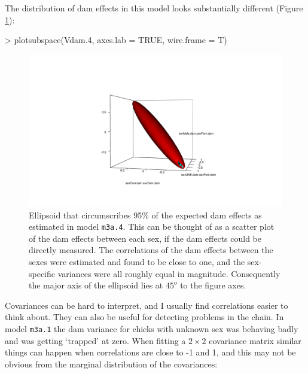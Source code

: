 \documentclass{article}
\begin{document}
The distribution of dam effects in this model looks substantially different (Figure \ref{rgl2-fig}):

\begin{Schunk}
\begin{Sinput}
> plotsubspace(Vdam.4, axes.lab = TRUE, wire.frame = T)
\end{Sinput}
\end{Schunk}

\begin{figure}[!h]
\begin{center}
\includegraphics{rgl2.pdf}
\end{center}
\caption{Ellipsoid that circumscribes 95\% of the expected dam effects as estimated in model \texttt{m3a.4}. This can be thought of as a scatter plot of the dam effects between each sex, if the dam effects could be directly measured.  The correlations of the dam effects between the sexes were estimated and found to be close to one, and the sex-specific variances were all roughly equal in magnitude.  Consequently the major axis of the ellipsoid lies at $45^{o}$ to the figure axes.}
\label{rgl2-fig}
\end{figure}


Covariances can be hard to interpret, and I usually find correlations easier to think about. They can also be useful for detecting problems in the chain. In model \texttt{m3a.1} the dam variance for chicks with unknown sex was behaving badly and was getting `trapped' at zero. When fitting a $2\times2$ covariance matrix similar things can happen when correlations are close to -1 and 1, and this may not be obvious from the marginal distribution of the covariances:

\begin{Schunk}
\end{Schunk}
\end{document}
